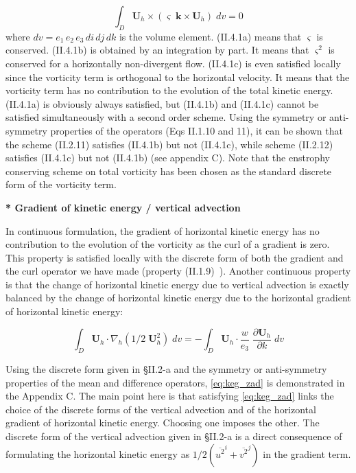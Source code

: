 \documentclass[../tex_main/NEMO_manual]{subfiles}
\begin{document}
\begin{equation} \label{eq:vor_energy}
\int_D {{\textbf{U}}_h \times \left( {\varsigma \;{\textbf{k}}\times {\textbf{U}}_h } \right)\;dv} =0
\end{equation}
where $dv = e_1\, e_2\, e_3\, di\, dj\, dk$ is the volume element. 
(II.4.1a) means that $\varsigma $ is conserved. (II.4.1b) is obtained by an 
integration by part. It means that $\varsigma^2$ is conserved for a horizontally 
non-divergent flow. 
(II.4.1c) is even satisfied locally since the vorticity term is orthogonal 
to the horizontal velocity. It means that the vorticity term has no 
contribution to the evolution of the total kinetic energy. (II.4.1a) is 
obviously always satisfied, but (II.4.1b) and (II.4.1c) cannot be satisfied 
simultaneously with a second order scheme. Using the symmetry or 
anti-symmetry properties of the operators (Eqs II.1.10 and 11), it can be 
shown that the scheme (II.2.11) satisfies (II.4.1b) but not (II.4.1c), while 
scheme (II.2.12) satisfies (II.4.1c) but not (II.4.1b) (see appendix C). 
Note that the enstrophy conserving scheme on total vorticity has been chosen 
as the standard discrete form of the vorticity term.

\textbf{* Gradient of kinetic energy / vertical advection}

In continuous formulation, the gradient of horizontal kinetic energy has no 
contribution to the evolution of the vorticity as the curl of a gradient is 
zero. This property is satisfied locally with the discrete form of both the 
gradient and the curl operator we have made (property (II.1.9)~). Another 
continuous property is that the change of horizontal kinetic energy due to 
vertical advection is exactly balanced by the change of horizontal kinetic 
energy due to the horizontal gradient of horizontal kinetic energy:

\begin{equation} \label{eq:keg_zad}
\int_D {{\textbf{U}}_h \cdot \nabla _h \left( {1/2\;{\textbf{U}}_h ^2} \right)\;dv} =-\int_D {{\textbf{U}}_h \cdot \frac{w}{e_3 }\;\frac{\partial 
{\textbf{U}}_h }{\partial k}\;dv}
\end{equation}

Using the discrete form given in {\S}II.2-a and the symmetry or 
anti-symmetry properties of the mean and difference operators, \autoref{eq:keg_zad} is 
demonstrated in the Appendix C. The main point here is that satisfying 
\autoref{eq:keg_zad} links the choice of the discrete forms of the vertical advection 
and of the horizontal gradient of horizontal kinetic energy. Choosing one 
imposes the other. The discrete form of the vertical advection given in 
{\S}II.2-a is a direct consequence of formulating the horizontal kinetic 
energy as $1/2 \left( \overline{u^2}^i + \overline{v^2}^j \right) $ in the gradient term.
\end{document}
